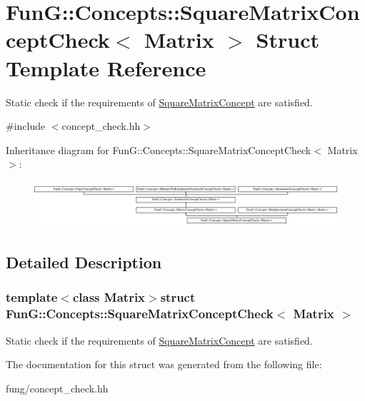 \hypertarget{structFunG_1_1Concepts_1_1SquareMatrixConceptCheck}{\section{Fun\-G\-:\-:Concepts\-:\-:Square\-Matrix\-Concept\-Check$<$ Matrix $>$ Struct Template Reference}
\label{structFunG_1_1Concepts_1_1SquareMatrixConceptCheck}
}


Static check if the requirements of \hyperlink{structFunG_1_1Concepts_1_1SquareMatrixConcept}{Square\-Matrix\-Concept} are satisfied.  




{\ttfamily \#include $<$concept\-\_\-check.\-hh$>$}

Inheritance diagram for Fun\-G\-:\-:Concepts\-:\-:Square\-Matrix\-Concept\-Check$<$ Matrix $>$\-:\begin{figure}[H]
\begin{center}
\leavevmode
\includegraphics[height=1.728395cm]{structFunG_1_1Concepts_1_1SquareMatrixConceptCheck}
\end{center}
\end{figure}


\subsection{Detailed Description}
\subsubsection*{template$<$class Matrix$>$struct Fun\-G\-::\-Concepts\-::\-Square\-Matrix\-Concept\-Check$<$ Matrix $>$}

Static check if the requirements of \hyperlink{structFunG_1_1Concepts_1_1SquareMatrixConcept}{Square\-Matrix\-Concept} are satisfied. 

The documentation for this struct was generated from the following file\-:\begin{DoxyCompactItemize}
\item 
fung/concept\-\_\-check.\-hh\end{DoxyCompactItemize}

